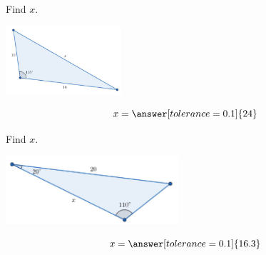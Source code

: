 \documentclass{ximera}
\begin{document}
\begin{problem}\label{prob:160hom12prob2}
Find $x$.
\begin{image}
   
\includegraphics[height=1in]{160H12pic3.jpg}~
 
\end{image}
$$x=\answer[tolerance=0.1]{24}$$
\end{problem}

\begin{problem}\label{prob:160hom12prob3}
Find $x$.
\begin{image}
   
\includegraphics[height=1in]{160H12pic2.jpg}~
 
\end{image}
$$x=\answer[tolerance=0.1]{16.3}$$
\end{problem}
\end{document}
